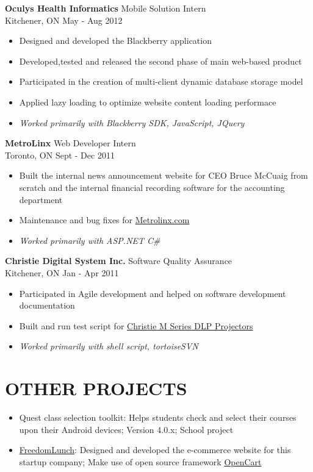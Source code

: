 \documentclass[line,margin]{res}
\begin{document}
\begin{resume}
{\bf Oculys Health Informatics} \hfill Mobile Solution Intern \\
Kitchener, ON \hfill May - Aug 2012
\begin{itemize}
\item Designed and developed the Blackberry application
\item Developed,tested and released the second phase of main web-based product
\item Participated in the creation of multi-client dynamic database storage model
\item Applied lazy loading to optimize website content loading performace
\item {\it Worked primarily with Blackberry SDK, JavaScript, JQuery}
\end{itemize}

{\bf MetroLinx} \hfill Web Developer Intern \\
Toronto, ON \hfill Sept - Dec 2011
\begin{itemize}
\item Built the internal news announcement website for CEO Bruce McCuaig from scratch and the internal financial recording software for the accounting department
\item Maintenance and bug fixes for \href{http://www.metrolinx.com/en/aboutus/about_us_index.aspx}{Metrolinx.com}
\item {\it Worked primarily with ASP.NET C\#}
\end{itemize}

{\bf Christie Digital System Inc.} \hfill Software Quality Assurance \\
Kitchener, ON \hfill Jan - Apr 2011
\begin{itemize}
\item Participated in Agile development and helped on software development documentation
\item Built and run test script for \href{http://www.christiedigital.com/en-us/business/products/projectors/3-chip-dlp/m-series/pages/default.aspx}{Christie M Series DLP Projectors}
\item {\it Worked primarily with shell script, tortoiseSVN}
\end{itemize}

\section{\uppercase{Other Projects}}
\begin{itemize}
\item Quest class selection toolkit: Helps students check and select their courses upon their Android devices; Version 4.0.x; School project
\item \href{http://www.freedomlunch.ca/most-popular}{FreedomLunch}: Designed and developed the e-commerce website for this startup company; Make use of open source framework \href{http://www.opencart.com/}{OpenCart}
\end{itemize}


\end{resume}
\end{document}

